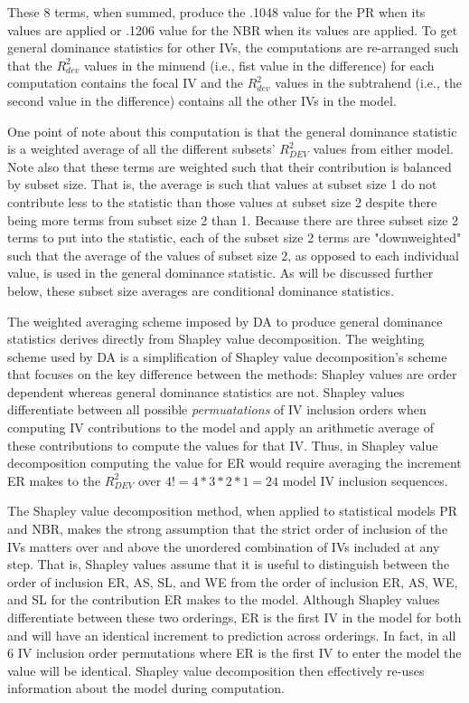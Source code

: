 \documentclass[ShortAfour,times,sageapa]{sagej}
\begin{document}
	These 8 terms, when summed, produce the .1048 value for the PR when its values are applied or .1206 value for the NBR when its values are applied.
	To get general dominance statistics for other IVs, the computations are re-arranged such that the $R^2_{dev}$ values in the minuend (i.e., fist value in the difference) for each computation contains the focal IV and the $R^2_{dev}$ values in the subtrahend (i.e., the second value in the difference) contains all the other IVs in the model.
	
	One point of note about this computation is that the general dominance statistic is a weighted average of all the different subsets' $R^2_{DEV}$ values from either model.
	Note also that these terms are weighted such that their contribution is balanced by subset size. 
	That is, the average is such that values at subset size 1 do not contribute less to the statistic than those values at subset size 2 despite there being more terms from subset size 2 than 1.
	Because there are three subset size 2 terms to put into the statistic, each of the subset size 2 terms are "downweighted" such that the average of the values of subset size 2, as opposed to each individual value, is used in the general dominance statistic.
	As will be discussed further below, these subset size averages are conditional dominance statistics.
	
	The weighted averaging scheme imposed by DA to produce general dominance statistics derives directly from Shapley value decomposition.
	The weighting scheme used by DA is a simplification of Shapley value decomposition's scheme that focuses on the key difference between the methods: Shapley values are order dependent whereas general dominance statistics are not.
	Shapley values differentiate between all possible \emph{permuatations} of IV inclusion orders when computing IV contributions to the model and apply an arithmetic average of these contributions to compute the values for that IV.
	Thus, in Shapley value decomposition computing the value for ER would require averaging the increment ER makes to the $R^2_{DEV}$ over $4! = 4*3*2*1 = 24$ model IV inclusion sequences.
	
	The Shapley value decomposition method, when applied to statistical models PR and NBR, makes the strong assumption that the strict order of inclusion of the IVs matters over and above the unordered combination of IVs included at any step.
	That is, Shapley values assume that it is useful to distinguish between the order of inclusion ER, AS, SL, and WE from the order of inclusion ER, AS, WE, and SL for the contribution ER makes to the model.
	Although Shapley values differentiate between these two orderings, ER is the first IV in the model for both and will have an identical increment to prediction across orderings.
	In fact, in all 6 IV inclusion order permutations where ER is the first IV to enter the model the value will be identical.
	Shapley value decomposition then effectively re-uses information about the model during computation.
	
\end{document}
